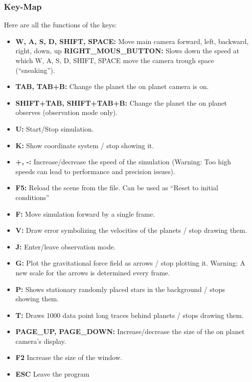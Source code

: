 \documentclass[a4paper,onesided,10pt]{article}
\begin{document}
\subsubsection{Key-Map}
Here are all the functions of the keys:
\begin{itemize}
	\item \textbf{W, A, S, D, SHIFT, SPACE:} Move main camera forward, left, backward, right, down, up
	\itme \textbf{RIGHT\_MOUS\_BUTTON:} Slows down the speed at which W, A, S, D, SHIFT, SPACE move the camera trough space ("`sneaking"').
	\item \textbf{TAB, TAB+B:} Change the planet the on planet camera is on.
	\item \textbf{SHIFT+TAB, SHIFT+TAB+B:} Change the planet the on planet observes (observation mode only).
	\item \textbf{U:} Start/Stop simulation.
	\item \textbf{K:} Show coordinate system / stop showing it.
	\item \textbf{+, -:} Increase/decrease the speed of the simulation (Warning: Too high speeds can lead to performance and precision issues).
	\item \textbf{F5:} Reload the scene from the file. Can be used as "`Reset to initial conditions"'
	\item \textbf{F:} Move simulation forward by a single frame.
	\item \textbf{V:} Draw error symbolizing the velocities of the planets / stop drawing them.
	\item \textbf{J:} Enter/leave observation mode.
	\item \textbf{G:} Plot the gravitational force field as arrows / stop plotting it. Warning: A new scale for the arrows is determined every frame.
	\item \textbf{P:} Shows stationary randomly placed stars in the background / stops showing them.
	\item \textbf{T:} Draws 1000 data point long traces behind planets / stops drawing them.
	\item \textbf{PAGE\_UP, PAGE\_DOWN:} Increase/decrease the size of the on planet camera's display.
	\item \textbf{F2} Increase the size of the window.
	\item \textbf{ESC} Leave the program
\end{itemize}
\end{document}
